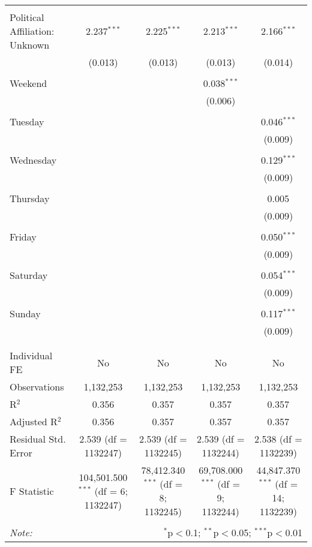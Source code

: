 \documentclass[
]{article}
\begin{document}
\begin{table}[!htbp]
{\begin{tabular}{@{\extracolsep{5pt}}lcccc}
  & & & & \\ 
 Political Affiliation: Unknown & 2.237$^{***}$ & 2.225$^{***}$ & 2.213$^{***}$ & 2.166$^{***}$ \\ 
  & (0.013) & (0.013) & (0.013) & (0.014) \\ 
  & & & & \\ 
 Weekend &  &  & 0.038$^{***}$ &  \\ 
  &  &  & (0.006) &  \\ 
  & & & & \\ 
 Tuesday &  &  &  & 0.046$^{***}$ \\ 
  &  &  &  & (0.009) \\ 
  & & & & \\ 
 Wednesday &  &  &  & 0.129$^{***}$ \\ 
  &  &  &  & (0.009) \\ 
  & & & & \\ 
 Thursday &  &  &  & 0.005 \\ 
  &  &  &  & (0.009) \\ 
  & & & & \\ 
 Friday &  &  &  & 0.050$^{***}$ \\ 
  &  &  &  & (0.009) \\ 
  & & & & \\ 
 Saturday &  &  &  & 0.054$^{***}$ \\ 
  &  &  &  & (0.009) \\ 
  & & & & \\ 
 Sunday &  &  &  & 0.117$^{***}$ \\ 
  &  &  &  & (0.009) \\ 
  & & & & \\ 
\hline \\[-1.8ex] 
Individual FE & No & No & No & No \\ 
Observations & 1,132,253 & 1,132,253 & 1,132,253 & 1,132,253 \\ 
R$^{2}$ & 0.356 & 0.357 & 0.357 & 0.357 \\ 
Adjusted R$^{2}$ & 0.356 & 0.357 & 0.357 & 0.357 \\ 
Residual Std. Error & 2.539 (df = 1132247) & 2.539 (df = 1132245) & 2.539 (df = 1132244) & 2.538 (df = 1132239) \\ 
F Statistic & 104,501.500$^{***}$ (df = 6; 1132247) & 78,412.340$^{***}$ (df = 8; 1132245) & 69,708.000$^{***}$ (df = 9; 1132244) & 44,847.370$^{***}$ (df = 14; 1132239) \\ 
\hline 
\hline \\[-1.8ex] 
\textit{Note:}  & \multicolumn{4}{r}{$^{*}$p$<$0.1; $^{**}$p$<$0.05; $^{***}$p$<$0.01} \\ 
\end{tabular}
} 
\end{table} 
\newpage
\end{document}
